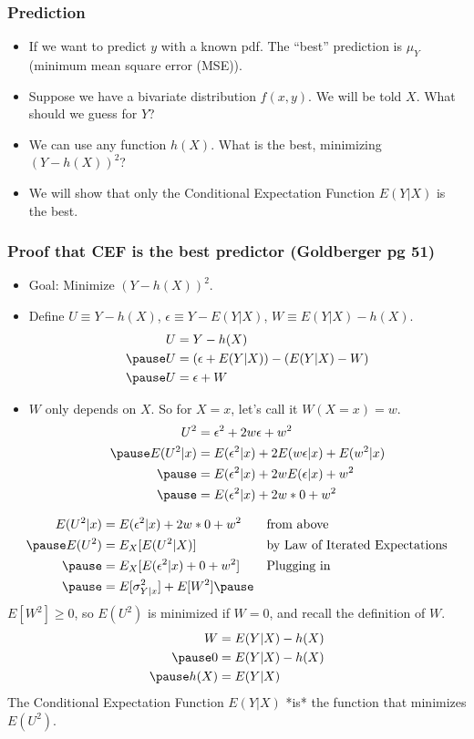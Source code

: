 \documentclass[aspectratio=169, handout]{beamer}
\numberwithin{equation}{section}
\begin{document}
\begin{frame}
\frametitle{Prediction}
\begin{itemize}
\item If we want to predict $y$ with a known pdf.  The ``best'' prediction is $\mu_Y$ (minimum mean square error (MSE)).\pause
\item Suppose we have a bivariate distribution $f(x,y)$.  We will be told $X$.  What should we guess for $Y$?\pause
\item We can use any function $h(X)$.  What is the best, minimizing $(Y-h(X))^2$?\pause
\item We will show that only the Conditional Expectation Function $E(Y|X)$ is the best.
\end{itemize}
\end{frame}

\begin{frame}
\frametitle{Proof that CEF is the best predictor (Goldberger pg 51)}
\begin{itemize}
\item Goal: Minimize $(Y-h(X))^2$. \pause
\item Define $U\equiv Y-h(X)$, $\epsilon \equiv Y-E(Y|X)$,  $W\equiv E(Y|X)-h(X)$. \pause
\begin{align*}
U&=Y-h(X)\\\pause
U&=(\epsilon+E(Y|X))-(E(Y|X)-W)\\\pause
U&=\epsilon+W
 \end{align*}
 \pause
 \item  $W$ only depends on $X$.  So for $X=x$, let's call it $W(X=x)=w$.\pause
\begin{align*}
U^2&=\epsilon^2+2w\epsilon+w^2\\\pause
E(U^2|x)&=E(\epsilon^2|x)+2E(w\epsilon|x)+E(w^2|x)\\\pause
&=E(\epsilon^2|x)+2wE(\epsilon|x)+w^2\\\pause
&=E(\epsilon^2|x)+2w*0+w^2\\
\end{align*}
\end{itemize}
\end{frame}

\begin{frame}
\begin{align*}
E(U^2|x)&=E(\epsilon^2|x)+2w*0+w^2 &&\text{from above}\\\pause
E(U^2)&=E_X[E(U^2|X)] && \text{by Law of Iterated Expectations}\\\pause
&=E_X[E(\epsilon^2|x)+0+w^2] &&\text{Plugging in} \\ \pause
&=E[\sigma^2_{Y|x}]+E[W^2]\pause
\end{align*}
$E[W^2]\geq0$, so $E(U^2)$ is minimized if $W=0$, and recall the definition of $W$.  \pause
\begin{align*}
W&=E(Y|X)-h(X)\\\pause
0&=E(Y|X)-h(X)\\\pause
h(X)&=E(Y|X)\\
\end{align*}
The Conditional Expectation Function $E(Y|X)$ *is* the function that minimizes $E(U^2)$.
\end{frame}
\end{document}
